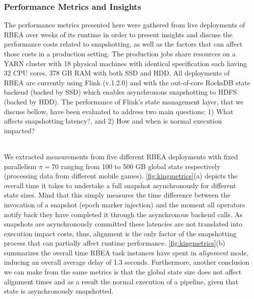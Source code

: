 \subsubsection{Performance Metrics and Insights} The performance metrics presented here were gathered from live deployments of RBEA over weeks of its runtime in order to present insights and discuss the performance costs related to snapshotting, as well as the factors that can affect those costs in a production setting. The production jobs share resources on a YARN cluster with 18 physical machines with identical specification each having 32 CPU cores, 378 GB RAM with both SSD and HDD. All deployments of RBEA are currently using Flink (v.1.2.0) and with the out-of-core RocksDB state backend (backed by SSD) which enables asynchronous snapshotting to HDFS (backed by HDD). The performance of Flink's state management layer, that we discuss bellow,  have been evaluated to address two main questions: 1) What affects  snapshotting latency?, and 2) How and when is normal execution impacted?

 \\
We extracted measurements from five different RBEA deployments with fixed parallelism $\pi = 70$ ranging from 100 to 500 GB global state respectively (processing data from different mobile games). \autoref{fig:kingmetrics}(a) depicts the overall time it takes to undertake a full snapshot asynchronously for different state sizes. Mind that this simply measures the time difference between the invocation of a snapshot (epoch marker injection) and the moment all operators notify back they have completed it through the asynchronous backend calls. As snapshots are asynchronously committed these latencies are not translated into execution impact costs, thus, alignment is the only factor of the snapshotting process that can partially affect runtime performance. \autoref{fig:kingmetrics}(b) summarizes the overall time RBEA task instances have spent in \emph{alignment} mode, inducing an overall average delay of 1.3 seconds. Furthermore, another conclusion we can make from the same metrics is that the global state size does not affect alignment times and as a result the normal execution of a pipeline, given that state is asynchronously snapshotted.

